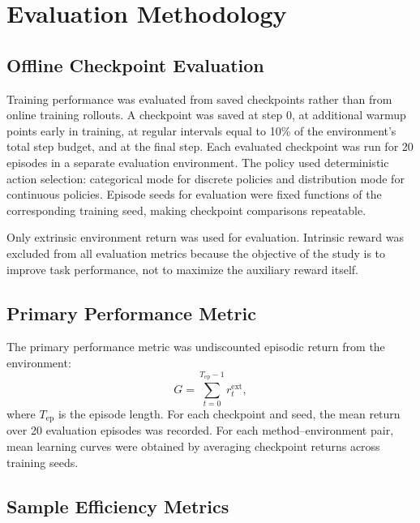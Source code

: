\section{Evaluation Methodology}
\label{sec:methodology_evaluation_methodology}

\subsection{Offline Checkpoint Evaluation}
\label{subsec:methodology_offline_checkpoint_evaluation}

Training performance was evaluated from saved checkpoints rather than from online training rollouts.
A checkpoint was saved at step 0, at additional warmup points early in training, at regular intervals equal to 10\% of the environment's total step budget, and at the final step.
Each evaluated checkpoint was run for 20 episodes in a separate evaluation environment.
The policy used deterministic action selection: categorical mode for discrete policies and distribution mode for continuous policies.
Episode seeds for evaluation were fixed functions of the corresponding training seed, making checkpoint comparisons repeatable.

Only extrinsic environment return was used for evaluation.
Intrinsic reward was excluded from all evaluation metrics because the objective of the study is to improve task performance, not to maximize the auxiliary reward itself.

\subsection{Primary Performance Metric}
\label{subsec:methodology_primary_performance_metric}

The primary performance metric was undiscounted episodic return from the environment:
\begin{equation}
    G = \sum_{t=0}^{T_{\mathrm{ep}}-1} r_t^{\mathrm{ext}},
\end{equation}
where $T_{\mathrm{ep}}$ is the episode length.
For each checkpoint and seed, the mean return over 20 evaluation episodes was recorded.
For each method--environment pair, mean learning curves were obtained by averaging checkpoint returns across training seeds.

\subsection{Sample Efficiency Metrics}
\label{subsec:methodology_sample_efficiency_metrics}

